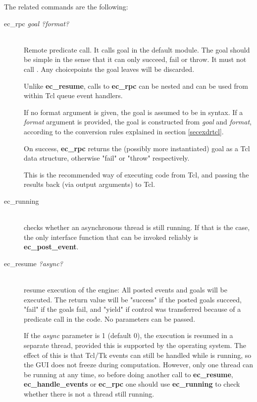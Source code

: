 The related commands are the following:
\begin{description}
\item[ec_rpc {\it goal ?format?}]\ \\
        Remote {\eclipse} predicate call.
        It calls goal in the default module. The goal should be simple
	in the sense that it can only succeed, fail or throw.
	It must not call
	.
        Any choicepoints the goal leaves will be discarded.

	Unlike {\bf ec_resume}, calls to {\bf ec_rpc} can be nested
	and can be used from within Tcl queue event handlers.

	If no format argument is given, the goal is assumed to be in
	{\eclipse} syntax. If a {\it format} argument is provided,
	the {\eclipse} goal is constructed from {\it goal} and {\it format},
	according to the conversion rules explained in section \ref{secexdrtcl}.

        On success, {\bf ec_rpc} returns the (possibly more instantiated)
	goal as a Tcl data structure, otherwise "fail" or "throw" respectively.

	This is the recommended way of executing {\eclipse} code from Tcl,
	and passing the results back (via output arguments) to Tcl.

\item[ec_running]\ \\
	checks whether an asynchronous {\eclipse} thread is still running.
	If that is the case, the only interface function that can be
	invoked reliably is {\bf ec_post_event}.

\item[ec_resume {\it ?async?}]\ \\
        resume execution of the {\eclipse} engine:  All posted events
        and goals will be executed.  The return value will be "success"
        if the posted goals succeed, "fail" if the goals fail, and
	"yield" if control was transferred because of a
        predicate call in the {\eclipse} code. No parameters can be passed.

	If the {\it async} parameter is 1 (default 0), the {\eclipse}
	execution is resumed in a separate thread, provided this is
	supported by the operating system.  The effect of this is that
	Tcl/Tk events can still be handled while {\eclipse} is
	running, so the GUI does not freeze during computation. 
	However, only one {\eclipse} thread can be running at any
	time, so before doing another call to {\bf ec_resume}, {\bf
	ec_handle_events} or {\bf ec_rpc} one should use {\bf
	ec_running} to check whether there is not a thread still running. 


\end{description}

